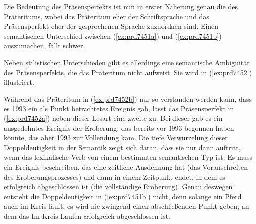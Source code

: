 
Die Bedeutung des Präsensperfekts ist nun in erster Näherung genau die des Präteritums, wobei das Präteritum eher der Schriftsprache und das Präsensperfekt eher der gesprochenen Sprache zuzuordnen sind.
Einen semantischen Unterschied zwischen (\ref{ex:prd7451a}) und (\ref{ex:prd7451b}) auszumachen, fällt schwer.

\begin{exe}
  \ex\label{ex:prd7451} 
  \begin{xlist}
  \end{xlist}
\end{exe}

Neben stilistischen Unterschieden gibt es allerdings eine semantische Ambiguität des Präsensperfekts, die das Präteritum nicht aufweist.
Sie wird in (\ref{ex:prd7452}) illustriert.

\begin{exe}
  \ex\label{ex:prd7452} 
  \begin{xlist}
  \end{xlist}
\end{exe}

Während das Präteritum in (\ref{ex:prd7452b}) nur so verstanden werden kann, dass es 1993 ein als Punkt betrachtetes Ereignis gab, lässt das Präsensperfekt in (\ref{ex:prd7452a}) neben dieser Lesart eine zweite zu.
Bei dieser gab es ein ausgedehntes Ereignis der Eroberung, das bereits vor 1993 begonnen haben könnte, das aber 1993 zur Vollendung kam.
Die tiefe Verwurzelung dieser Doppeldeutigkeit in der Semantik zeigt sich daran, dass sie nur dann auftritt, wenn das lexikalische Verb von einem bestimmten semantischen Typ ist.
Es muss ein Ereignis beschreiben, das eine zeitliche Ausdehnung hat (\zB das Voranschreiten des Eroberungsprozesses) und dann in einem Zeitpunkt endet, in dem es erfolgreich abgeschlossen ist (die vollständige Eroberung).
Genau deswegen entsteht die Doppeldeutigkeit in (\ref{ex:prd7451b}) nicht, denn solange ein Pferd auch im Kreis läuft, es wird nie zwingend einen abschließenden Punkt geben, an dem das Im-Kreis-Laufen erfolgreich abgeschlossen ist.

